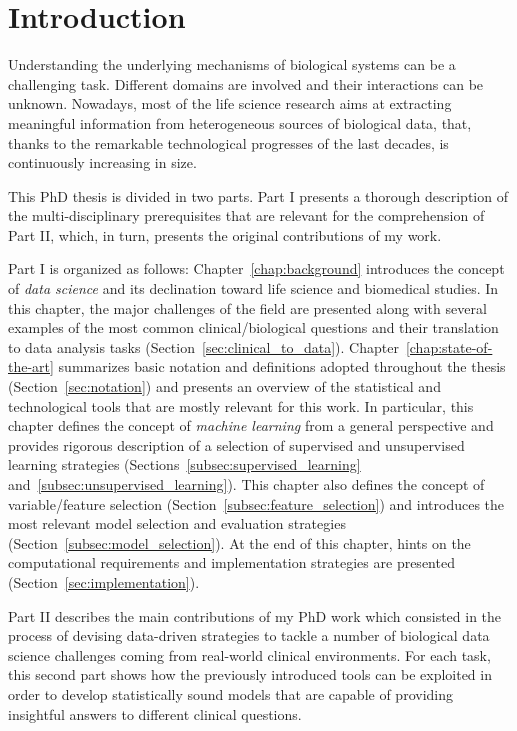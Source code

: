 
\chapter{Introduction} \label{chapter:introduction}
Understanding the underlying mechanisms of biological systems can be a challenging task. Different domains are involved and their interactions can be unknown.
Nowadays, most of the life science research aims at extracting meaningful information from heterogeneous sources of biological data, that, thanks to the remarkable technological progresses of the last decades, is continuously increasing in size.

This PhD thesis is divided in two parts. Part I presents a thorough description of the multi-disciplinary prerequisites that are relevant for the comprehension of Part II, which, in turn, presents the original contributions of my work.

Part I is organized as follows: Chapter~\ref{chap:background} introduces the concept of \textit{data science} and its declination toward life science and biomedical studies. In this chapter, the major challenges of the field are presented along with several examples of the most common clinical/biological questions and their translation to data analysis tasks (Section~\ref{sec:clinical_to_data}).
Chapter~\ref{chap:state-of-the-art} summarizes basic notation and definitions adopted throughout the thesis (Section~\ref{sec:notation}) and presents an overview of the statistical and technological tools that are mostly relevant for this work. In particular, this chapter defines the concept of \textit{machine learning} from a general perspective and provides rigorous description of a selection of supervised and unsupervised learning strategies (Sections~\ref{subsec:supervised_learning} and~\ref{subsec:unsupervised_learning}).
This chapter also defines the concept of variable/feature selection (Section~\ref{subsec:feature_selection}) and introduces the most relevant model selection and evaluation strategies (Section~\ref{subsec:model_selection}).
At the end of this chapter, hints on the computational requirements and implementation strategies are presented (Section~\ref{sec:implementation}).

Part II describes the main contributions of my PhD work which consisted in the process of devising data-driven strategies to tackle a number of biological data science challenges coming from real-world clinical environments. For each task, this second part shows how the previously introduced tools can be exploited in order to develop statistically sound models that are capable of providing insightful answers to different clinical questions.


